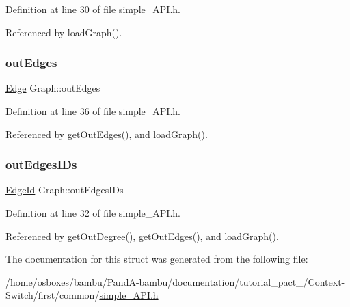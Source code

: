 Definition at line 30 of file simple\+\_\+\+A\+P\+I.\+h.



Referenced by load\+Graph().

\mbox{\label{structGraph_af60caacc896273777695c935b9a66482}} 
\subsubsection{\texorpdfstring{out\+Edges}{outEdges}}
{\footnotesize\ttfamily \hyperlink{structEdge}{Edge} Graph\+::out\+Edges}



Definition at line 36 of file simple\+\_\+\+A\+P\+I.\+h.



Referenced by get\+Out\+Edges(), and load\+Graph().

\mbox{\label{structGraph_add76b6fb8edce38ddb9bc705b62205e2}} 
\subsubsection{\texorpdfstring{out\+Edges\+I\+Ds}{outEdgesIDs}}
{\footnotesize\ttfamily \hyperlink{first_2common_2simple__API_8h_a607d67511109aa62187da7c6e6a0167c}{Edge\+Id} Graph\+::out\+Edges\+I\+Ds}



Definition at line 32 of file simple\+\_\+\+A\+P\+I.\+h.



Referenced by get\+Out\+Degree(), get\+Out\+Edges(), and load\+Graph().



The documentation for this struct was generated from the following file\+:\begin{DoxyCompactItemize}
\item 
/home/osboxes/bambu/\+Pand\+A-\/bambu/documentation/tutorial\+\_\+pact\+\_/\+Context-\/\+Switch/first/common/\hyperlink{first_2common_2simple__API_8h}{simple\+\_\+\+A\+P\+I.\+h}\end{DoxyCompactItemize}
